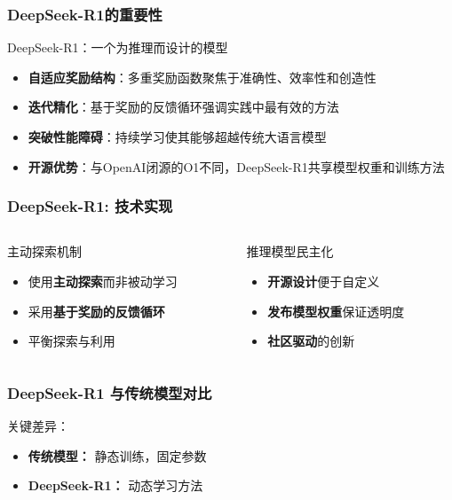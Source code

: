\documentclass[aspectratio=169]{beamer}
\begin{document}
\begin{frame}
	\frametitle{DeepSeek-R1的重要性}
	\begin{block}{DeepSeek-R1：一个为推理而设计的模型}
		\begin{itemize}
			\item \textbf{自适应奖励结构}：多重奖励函数聚焦于准确性、效率性和创造性
			\item \textbf{迭代精化}：基于奖励的反馈循环强调实践中最有效的方法
			\item \textbf{突破性能障碍}：持续学习使其能够超越传统大语言模型
			\item \textbf{开源优势}：与OpenAI闭源的O1不同，DeepSeek-R1共享模型权重和训练方法
		\end{itemize}
	\end{block}
\end{frame}

\begin{frame}[shrink=10]
	\frametitle{\textbf{DeepSeek-R1}: 技术实现}
	\begin{columns}[T]
		\begin{column}{0.48\textwidth}
			\begin{block}{主动探索机制}
				\begin{itemize}\setlength{\itemsep}{0em}
					\item 使用\textbf{主动探索}而非被动学习
					\item 采用\textbf{基于奖励的反馈循环}
					\item 平衡探索与利用
				\end{itemize}
			\end{block}
		\end{column}
		\begin{column}{0.48\textwidth}
			\begin{block}{推理模型民主化}
				\begin{itemize}\setlength{\itemsep}{0em}
					\item \textbf{开源设计}便于自定义
					\item \textbf{发布模型权重}保证透明度
					\item \textbf{社区驱动}的创新
				\end{itemize}
			\end{block}
		\end{column}
	\end{columns}
\end{frame}

\begin{frame}[shrink=20]
	\frametitle{DeepSeek-R1 与传统模型对比}
	\vspace{-0.2cm}
	\begin{block}{关键差异：}
		\setlength{\itemsep}{0.5em}
		\begin{itemize}
			\item \textbf{传统模型：} 静态训练，固定参数
			\item \textbf{DeepSeek-R1：} 动态学习方法
		\end{itemize}
	\end{block}
\end{frame}
\end{document}
